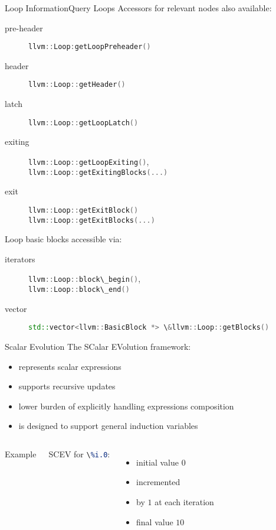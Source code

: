 \documentclass[10pt,mathserif]{beamer}
\newcommand{\cppinline}[1]{\lstinline[language=C++]!#1!}
\newcommand{\llvminput}[1]{}
\newcommand{\llvminline}[1]{\lstinline[language=LLVM]!#1!}
\begin{document}
\begin{frame}{Loop Information}{Query Loops}
Accessors for relevant nodes also available:

\begin{description}
\item[pre-header] \cppinline{llvm::Loop:getLoopPreheader()}
\item[header] \cppinline{llvm::Loop::getHeader()}
\item[latch] \cppinline{llvm::Loop::getLoopLatch()}
\item[exiting] \cppinline{llvm::Loop::getLoopExiting()}, \\
               \cppinline{llvm::Loop::getExitingBlocks(...)}
\item[exit] \cppinline{llvm::Loop::getExitBlock()} \\
            \cppinline{llvm::Loop::getExitBlocks(...)}
\end{description}

Loop basic blocks accessible via:

\begin{description}
\item[iterators] \cppinline{llvm::Loop::block\_begin()}, \\
                 \cppinline{llvm::Loop::block\_end()}
\item[vector]
      \cppinline{std::vector<llvm::BasicBlock *> \&llvm::Loop::getBlocks()}
\end{description}
\end{frame}

\begin{frame}{Scalar Evolution}
The \alert{SC}alar \alert{EV}olution framework:

\begin{itemize}
\item represents scalar expressions
\item supports recursive updates
\item lower burden of explicitly handling expressions composition
\item is designed to support \alert{general induction variables}
\end{itemize}

\begin{columns}
\begin{block}{Example}
\centering
\llvminput{snippet/02/basic-scev.ll}
\end{block}

SCEV for \llvminline{\%i.0}:

\begin{itemize}
\item initial value $0$
\item incremented
\item by $1$ at each iteration
\item final value $10$
\end{itemize}
\end{columns}
\end{frame}
\end{document}

